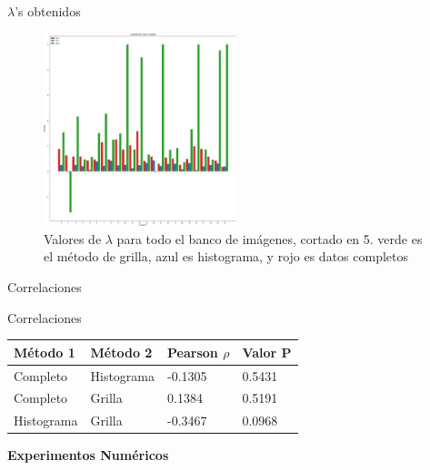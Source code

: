 \documentclass{beamer}
\begin{document}
\begin{frame}{$\lambda$'s obtenidos}
    \begin{figure}[H]
        \centering
        \includegraphics[width=0.5\textwidth]{lambda_clip.png}
        \caption{Valores de $\lambda$ para todo el banco de im\'agenes, cortado en 5. verde es el m\'etodo de grilla, azul es histograma, y rojo es datos completos}
        \label{fig:lambda_clip}
    \end{figure}
\end{frame}


\begin{frame}{Correlaciones}
    \begin{block}{Correlaciones}
        
        \begin{table}[H]
            \centering
            \begin{tabular}{|l|l|l|l|}
                \hline
                M\'etodo 1 & M\'etodo 2 & Pearson $\rho$ & Valor P \\ \hline
                Completo                  & Histograma                & -0.1305   & 0.5431  \\ 
                Completo                  & Grilla                    & 0.1384    & 0.5191  \\ 
                Histograma                & Grilla                    & -0.3467   & 0.0968  \\ \hline
            \end{tabular}
        \end{table}
    \end{block}
\end{frame}

\begin{frame}
    \begin{center}
        {\LARGE\bf Experimentos Numéricos}
    \end{center}
\end{frame}
\end{document}
